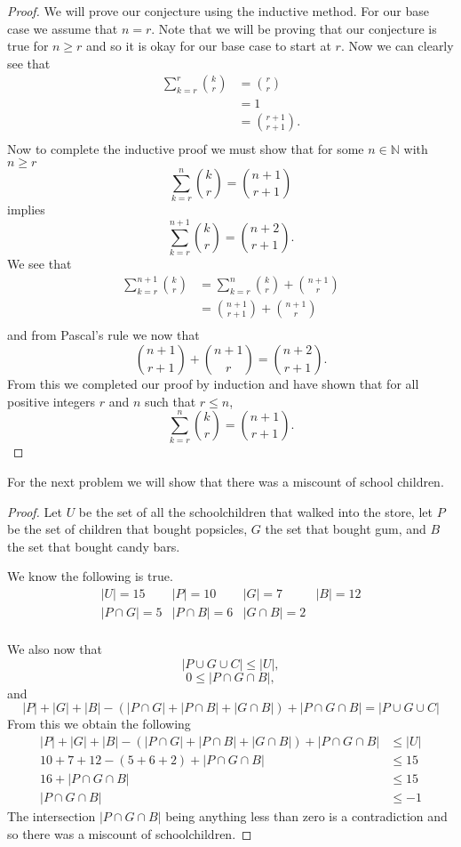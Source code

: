\documentclass[12pt]{article}
\begin{document}
\begin{proof}
We will prove our conjecture using the inductive method. For our base case we assume that $n = r.$ Note that we will be proving that our conjecture is true for $n \geq r$ and so it is okay for our base case to start at $r$. Now we can clearly see that
\begin{align*}
\sum\limits_{k=r}^r\binom{k}{r} &= \binom{r}{r}\\
&=1\\
&=\binom{r+1}{r+1}.\\
\end{align*}
Now to complete the inductive proof we must show that for some $n\in \mathbb{N}$ with $n\geq r$
\[\sum\limits_{k=r}^n\binom{k}{r} = \binom{n+1}{r+1}\]
implies
\[\sum\limits_{k=r}^{n+1}\binom{k}{r} = \binom{n+2}{r+1}.\]
We see that
\begin{align*}
\sum\limits_{k=r}^{n+1}\binom{k}{r} &= \sum\limits_{k=r}^n\binom{k}{r}+\binom{n+1}{r}\\
&= \binom{n+1}{r+1} + \binom{n+1}{r}\\
\end{align*}
and from Pascal's rule we now that
\[\binom{n+1}{r+1} + \binom{n+1}{r} = \binom{n+2}{r+1}.\]
From this we completed our proof by induction and have shown that for all positive integers $r$ and $n$ such that $r\leq n$,
\[\sum\limits_{k=r}^{n}\binom{k}{r} = \binom{n+1}{r+1}.\]
\end{proof}

For the next problem we will show that there was a miscount of school children.
\begin{proof}
Let $U$ be the set of all the schoolchildren that walked into the store, let $P$ be the set of children that bought popsicles, $G$ the set that bought gum, and $B$ the set that bought candy bars.

\noindent We know the following is true.
\[
\begin{array}{cccc}
|U| = 15		&	|P| = 10		&	|G| = 7			&	|B| = 12	\\
|P\cap G| = 5	&	|P\cap B| = 6	&	|G\cap B| = 2	&				\\
\end{array}
\]

We also now that
\[|P\cup G\cup C| \leq |U|,\]
\[0\leq |P\cap G\cap B|,\]
and
\[|P|+|G|+|B|-(|P\cap G|+|P\cap B|+|G\cap B|)+|P\cap G\cap B| = |P\cup G\cup C|\]
From this we obtain the following
\begin{align*}
|P|+|G|+|B|-(|P\cap G|+|P\cap B|+|G\cap B|)+|P\cap G\cap B| &\leq |U|\\
10+7+12-(5+6+2)+|P\cap G\cap B|&\leq 15\\
16+|P\cap G\cap B|&\leq 15\\
|P\cap G\cap B|&\leq -1
\end{align*}
The intersection $|P\cap G\cap B|$ being anything less than zero is a contradiction and so there was a miscount of schoolchildren.
\end{proof}
\end{document}
